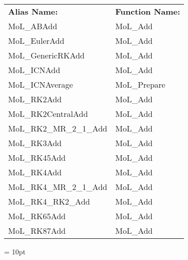 \hspace{5mm}

 \begin{tabular*}{160mm}{ll} 

{\bf Alias Name:} ~~~~~~~ & {\bf Function Name:} \\ 
MoL\_ABAdd & MoL\_Add \\ 
MoL\_EulerAdd & MoL\_Add \\ 
MoL\_GenericRKAdd & MoL\_Add \\ 
MoL\_ICNAdd & MoL\_Add \\ 
MoL\_ICNAverage & MoL\_Prepare \\ 
MoL\_RK2Add & MoL\_Add \\ 
MoL\_RK2CentralAdd & MoL\_Add \\ 
MoL\_RK2\_MR\_2\_1\_Add & MoL\_Add \\ 
MoL\_RK3Add & MoL\_Add \\ 
MoL\_RK45Add & MoL\_Add \\ 
MoL\_RK4Add & MoL\_Add \\ 
MoL\_RK4\_MR\_2\_1\_Add & MoL\_Add \\ 
MoL\_RK4\_RK2\_Add & MoL\_Add \\ 
MoL\_RK65Add & MoL\_Add \\ 
MoL\_RK87Add & MoL\_Add \\ 
\end{tabular*} 



\vspace{5mm}\parskip = 10pt 

